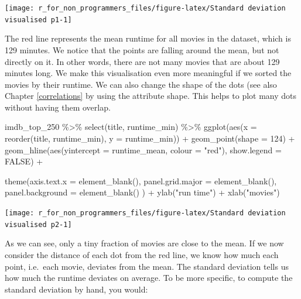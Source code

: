 \documentclass[
]{book}
\newenvironment{Shaded}{\begin{snugshade}}{\end{snugshade}}
\newcommand{\AttributeTok}[1]{\textcolor[rgb]{0.77,0.63,0.00}{#1}}
\newcommand{\ConstantTok}[1]{\textcolor[rgb]{0.00,0.00,0.00}{#1}}
\newcommand{\DecValTok}[1]{\textcolor[rgb]{0.00,0.00,0.81}{#1}}
\newcommand{\FunctionTok}[1]{\textcolor[rgb]{0.00,0.00,0.00}{#1}}
\newcommand{\NormalTok}[1]{#1}
\newcommand{\SpecialCharTok}[1]{\textcolor[rgb]{0.00,0.00,0.00}{#1}}
\newcommand{\StringTok}[1]{\textcolor[rgb]{0.31,0.60,0.02}{#1}}
\begin{document}
\begin{center}\texttt{[image: r\_for\_non\_programmers\_files/figure-latex/Standard deviation visualised p1-1]} \end{center}

The red line represents the mean runtime for all movies in the dataset, which is 129 minutes. We notice that the points are falling around the mean, but not directly on it. In other words, there are not many movies that are about 129 minutes long. We make this visualisation even more meaningful if we sorted the movies by their runtime. We can also change the shape of the dots (see also Chapter \ref{correlations} by using the attribute shape. This helps to plot many dots without having them overlap.

\begin{Shaded}
\begin{Highlighting}[]
\NormalTok{imdb\_top\_250 }\SpecialCharTok{\%\textgreater{}\%} 
  \FunctionTok{select}\NormalTok{(title, runtime\_min) }\SpecialCharTok{\%\textgreater{}\%} 
  \FunctionTok{ggplot}\NormalTok{(}\FunctionTok{aes}\NormalTok{(}\AttributeTok{x =} \FunctionTok{reorder}\NormalTok{(title, runtime\_min), }\AttributeTok{y =}\NormalTok{ runtime\_min)) }\SpecialCharTok{+}
  \FunctionTok{geom\_point}\NormalTok{(}\AttributeTok{shape =} \DecValTok{124}\NormalTok{) }\SpecialCharTok{+}
  \FunctionTok{geom\_hline}\NormalTok{(}\FunctionTok{aes}\NormalTok{(}\AttributeTok{yintercept =}\NormalTok{ runtime\_mean, }\AttributeTok{colour =} \StringTok{"red"}\NormalTok{), }\AttributeTok{show.legend =} \ConstantTok{FALSE}\NormalTok{) }\SpecialCharTok{+}
  
  \FunctionTok{theme}\NormalTok{(}\AttributeTok{axis.text.x =} \FunctionTok{element\_blank}\NormalTok{(),    }
        \AttributeTok{panel.grid.major =} \FunctionTok{element\_blank}\NormalTok{(),}
        \AttributeTok{panel.background =} \FunctionTok{element\_blank}\NormalTok{()}
\NormalTok{        ) }\SpecialCharTok{+}
  \FunctionTok{ylab}\NormalTok{(}\StringTok{"run time"}\NormalTok{) }\SpecialCharTok{+}
  \FunctionTok{xlab}\NormalTok{(}\StringTok{"movies"}\NormalTok{)}
\end{Highlighting}
\end{Shaded}

\begin{center}\texttt{[image: r\_for\_non\_programmers\_files/figure-latex/Standard deviation visualised p2-1]} \end{center}

As we can see, only a tiny fraction of movies are close to the mean. If we now consider the distance of each dot from the red line, we know how much each point, i.e.~each movie, deviates from the mean. The standard deviation tells us how much the runtime deviates on average. To be more specific, to compute the standard deviation by hand, you would:
\end{document}
